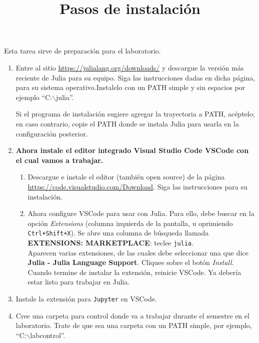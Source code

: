 \documentclass[11pt, a4paper]{article}
\title{\Large \textbf{Pasos de instalación}}
\author{}
\date{}
\begin{document}
	
	\maketitle
	\vspace{-1cm}
	
	\noindent Esta tarea sirve de preparación para el laboratorio.
	
	\begin{enumerate}[leftmargin=*]
 \item Entre al sitio \url{https://julialang.org/downloads/} y descargue la versión más reciente de Julia  para su equipo. Siga las instrucciones dadas en dicha página, para su sistema operativo.Instalelo con un PATH simple y sin espacios por ejemplo ``C:$\backslash$julia''.
 
 Si el programa de instalación sugiere agregar la trayectoria a PATH, acéptelo; en caso contrario, copie el PATH donde se instala Julia para usarla en la configuración posterior.
			

		
\item \textbf{Ahora instale el editor integrado Visual Studio Code VSCode con el cual vamos a trabajar.}
		\begin{enumerate}[label=\alph*)]

\item Descargue e instale el editor (también open source) de la página \url{https://code.visualstudio.com/Download}. Siga las instrucciones para su instalación.

\item Ahora configure VSCode para usar con Julia. Para ello, debe buscar en la opción \textit{Extensions} (columna izquierda de la pantalla, u oprimiendo \texttt{Ctrl+Shift+X}). Se abre una columna de búsqueda llamada \textbf{EXTENSIONS: MARKETPLACE}: teclee \texttt{julia}.\\
			Aparecen varias extensiones, de las cuales debe seleccionar una que dice \textbf{Julia - Julia Language Support}. Cliquee sobre el botón \textit{Install}. Cuando termine de instalar la extensión, reinicie VSCode. Ya debería estar listo para trabajar en Julia.
		\end{enumerate}

\item Instale la extensión para \texttt{Jupyter} en VSCode.

\item Cree una carpeta para control donde va a trabajar durante el semestre en el laboratorio. Trate de que sea una carpeta con un PATH simple, por ejemplo, ``C:$\backslash$labcontrol''. 


\end{enumerate}
\end{document}

